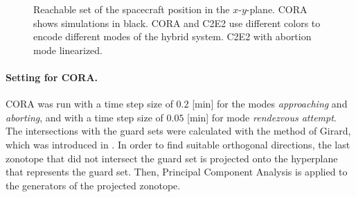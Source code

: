 \documentclass[EPiC]{easychair}
\begin{document}
\begin{figure}[t]
  \hspace{0.2in}
  \hspace{0.2in}
\caption{Reachable set of the spacecraft position in the $x$-$y$-plane.
CORA shows simulations in black. CORA and C2E2 use different colors to encode different modes of the hybrid system. C2E2 with abortion mode linearized.}
\label{fig:spacecraft}
\end{figure}


\paragraph{Setting for CORA.}
CORA was run with a time step size of $0.2$ [min] for the modes \textit{approaching} and \textit{aborting}, and with a time step size of $0.05$ [min] for mode \textit{rendezvous attempt}. The intersections with the guard sets were calculated with the method of Girard, which was introduced in \cite{Girard2008}. In order to find suitable orthogonal directions, the last zonotope that did not intersect the guard set is projected onto the hyperplane that represents the guard set. Then, Principal Component Analysis is applied to the generators of the projected zonotope.
\end{document}
